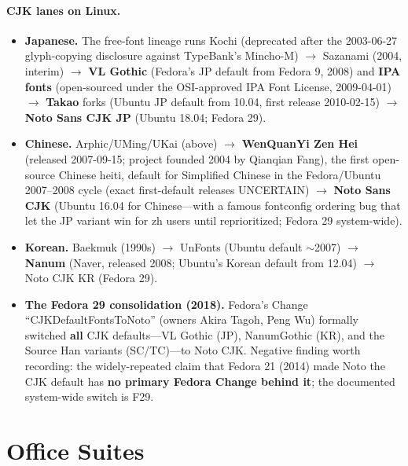\documentclass[10pt,a4paper]{article}
\begin{document}
\paragraph{CJK lanes on Linux.}
\begin{itemize}[leftmargin=1.2em,itemsep=2pt]
\item \textbf{Japanese.} The free-font lineage runs Kochi (deprecated after the
2003-06-27 glyph-copying disclosure against TypeBank's Mincho-M) $\rightarrow$ Sazanami
(2004, interim) $\rightarrow$ \textbf{VL Gothic} (Fedora's JP default from Fedora 9,
2008) and \textbf{IPA fonts} (open-sourced under the OSI-approved IPA Font License,
2009-04-01) $\rightarrow$ \textbf{Takao} forks (Ubuntu JP default from 10.04, first
release 2010-02-15) $\rightarrow$ \textbf{Noto Sans CJK JP} (Ubuntu 18.04; Fedora
29).\cite{l-kochi,l-vlgothic,l-ipa,l-takao,l-noto-switch,l-noto-switch-2,l-noto-switch-3}
\item \textbf{Chinese.} Arphic/UMing/UKai (above) $\rightarrow$ \textbf{WenQuanYi Zen
Hei} (released 2007-09-15; project founded 2004 by Qianqian Fang), the first
open-source Chinese heiti, default for Simplified Chinese in the Fedora/Ubuntu
2007--2008 cycle (exact first-default releases UNCERTAIN) $\rightarrow$ \textbf{Noto
Sans CJK} (Ubuntu 16.04 for Chinese---with a famous fontconfig ordering bug that let
the JP variant win for zh users until reprioritized; Fedora 29
system-wide).\cite{l-wqy,l-noto-switch,l-noto-switch-2,l-noto-switch-3}
\item \textbf{Korean.} Baekmuk (1990s) $\rightarrow$ UnFonts (Ubuntu default $\sim$2007)
$\rightarrow$ \textbf{Nanum} (Naver, released 2008; Ubuntu's Korean default from 12.04)
$\rightarrow$ Noto CJK KR (Fedora 29).\cite{l-nanum,l-nanum-2,l-noto-switch,l-noto-switch-2,l-noto-switch-3}
\item \textbf{The Fedora 29 consolidation (2018).} Fedora's Change
``CJKDefaultFontsToNoto'' (owners Akira Tagoh, Peng Wu) formally switched \textbf{all}
CJK defaults---VL Gothic (JP), NanumGothic (KR), and the Source Han variants
(SC/TC)---to Noto CJK. Negative finding worth recording: the widely-repeated claim that
Fedora 21 (2014) made Noto the CJK default has \textbf{no primary Fedora Change behind
it}; the documented system-wide switch is
F29.\cite{l-noto-switch,l-noto-switch-2,l-noto-switch-3}
\end{itemize}

\section{Office Suites}\label{sec:office}
\end{document}
